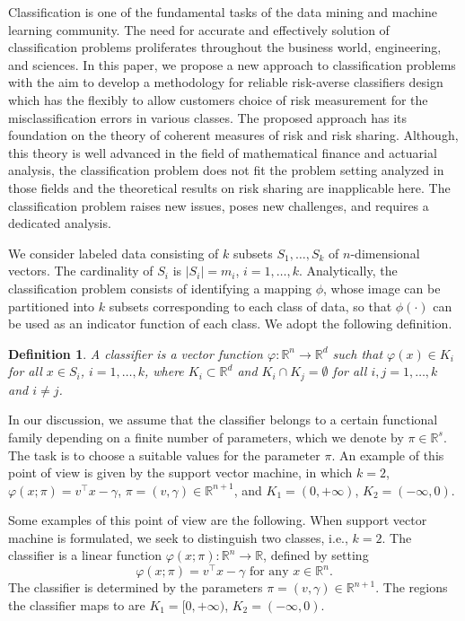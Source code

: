 \documentclass[10pt,letterpaper]{article}
\newcommand{\R}{\mathbb{R}}
\newcommand{\1}{1{\hskip -2.55 pt}\hbox{I}}
\newtheorem{definition}[theorem]{Definition}
\begin{document}
Classification is one of the fundamental tasks of the data mining and machine learning community.
The need for accurate and effectively solution of classification problems proliferates throughout the business world, engineering, and sciences.
In this paper, we propose a new approach to classification problems with the aim to develop a methodology for reliable risk-averse classifiers design which has the flexibly to allow customers choice of risk measurement for the misclassification errors in various classes.
The proposed approach has its foundation on the theory of coherent measures of risk and risk sharing. Although, this theory is well advanced in the field of mathematical finance and actuarial analysis, the classification problem does not fit the problem setting analyzed in those fields and the theoretical results on risk sharing are inapplicable here. The classification problem raises new issues, poses new challenges, and requires a dedicated analysis.


We consider labeled data consisting of $k$ subsets $S_1,\dots, S_k$ of $n$-dimensional vectors. The cardinality of $S_i$ is $|S_i|=m_i$, $i=1,\dots, k$.
Analytically, the classification problem consists of identifying a mapping $\phi$, whose image can be partitioned into $k$ subsets corresponding to each class of data, so that $\phi (\cdot)$ can be used as an indicator function of each class. We adopt the following definition.
\begin{definition}
\label{def:general}
A classifier is a vector function $\varphi:\R^n\to\R^d$ such that $\varphi(x) \in K_i$ for all $x\in S_i$, $i=1,\dots,k$, where $K_i\subset\R^d$ and $K_i\cap K_j=\emptyset$ for all $i,j=1,\dots,k$ and $i\neq j$.
\end{definition}
In our discussion, we assume that the classifier belongs to a certain functional family depending on a finite number of parameters, which we denote by $\pi\in\R^s$. The task is to choose a suitable values for the parameter $\pi$. An example of this point of view is given by the support vector machine, in which $k=2$, $\varphi(x;\pi) = v^\top x -\gamma$, $\pi= (v,\gamma)\in\R^{n+1}$, and $K_1= (0,+\infty)$, $K_2= (-\infty,0)$.

Some examples of this point of view are the following.
When support vector machine is formulated, we seek to distinguish two classes, i.e., $k=2$. The classifier is a linear function $\varphi(x;\pi) :\mathbb R^n\to \mathbb R$, defined by setting 
\[
\varphi(x;\pi)= v^\top x -\gamma \text{ for any } x\in\mathbb R^n. 
\]
The classifier is determined by the parameters $\pi= (v,\gamma)\in\R^{n+1}$. The regions the classifier maps to are $K_1= [0,+\infty)$, $K_2= (-\infty,0)$. 
\end{document}

